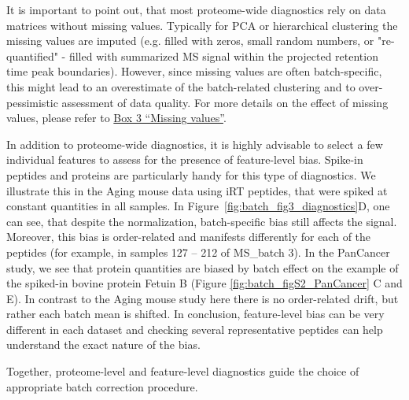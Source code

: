 \documentclass[num-refs]{wiley-article}
\begin{document}
It is important to point out, that most proteome-wide diagnostics rely on data matrices without missing values. Typically for PCA or hierarchical clustering the missing values are imputed (e.g. filled with zeros, small random numbers, or "re-quantified" - filled with summarized MS signal within the projected retention time peak boundaries). However, since missing values are often batch-specific, this might lead to an overestimate of the batch-related clustering and to over-pessimistic assessment of data quality. For more details on the effect of missing values, please refer to \hyperref[box:Box3_missingness]{Box 3 “Missing values”}.

In addition to proteome-wide diagnostics, it is highly advisable to select a few individual features to assess for the presence of feature-level bias. Spike-in peptides and proteins are particularly handy for this type of diagnostics. We illustrate this in the Aging mouse data using iRT peptides, that were spiked at constant quantities in all samples. In Figure~\ref{fig:batch_fig3_diagnostics}D, one can see, that despite the normalization, batch-specific bias still affects the signal. Moreover, this bias is order-related and manifests differently for each of the peptides (for example, in samples 127 – 212 of MS\_batch 3). In the PanCancer study, we see that protein quantities are biased by batch effect on the example of the spiked-in bovine protein Fetuin B (Figure \ref{fig:batch_figS2_PanCancer} {C and E}). In contrast to the Aging mouse study here there is no order-related drift, but rather each batch mean is shifted. In conclusion, feature-level bias can be very different in each dataset and checking several representative peptides can help understand the exact nature of the bias.

Together, proteome-level and feature-level diagnostics guide the choice of appropriate batch correction procedure.
\end{document}
